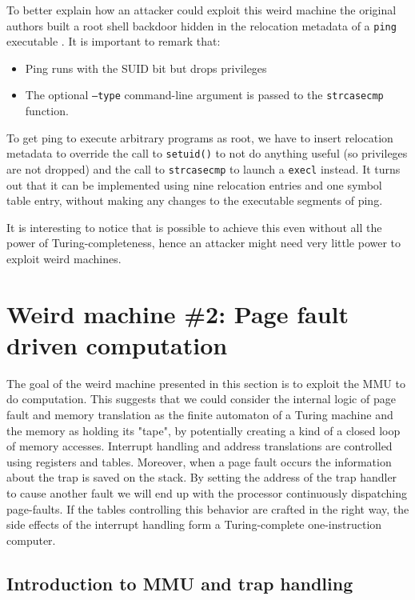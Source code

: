 \documentclass[11pt,twoside,a4paper]{article}
\begin{document}
To better explain how an attacker could exploit this weird machine the original authors built a root shell backdoor hidden in the relocation metadata of a \texttt{ping} executable \cite{ping_elf}. It is important to remark that: 
\begin{itemize}
\item Ping runs with the SUID bit but drops privileges 
\item The optional \texttt{--type} command-line argument is passed to the \texttt{strcasecmp} function.
\end{itemize}

To get ping to execute arbitrary programs as root, we have to insert relocation metadata to override the call to \texttt{setuid()} to not do anything useful (so privileges are not dropped) and the call to \texttt{strcasecmp} to launch a \texttt{execl} instead. It turns out that it can be implemented using nine relocation entries and one symbol table entry, without making any changes to the executable segments of ping.

It is interesting to notice that is possible to achieve this even without all the power of Turing-completeness, hence an attacker might need very little power to exploit weird machines.

\section{Weird machine \#2: Page fault driven computation}
The goal of the weird machine presented in this section is to exploit the MMU to do computation. This suggests that we could consider the internal logic of page fault and memory translation as the finite automaton of a Turing machine and the memory as holding its "tape", by potentially creating a kind of a closed loop of memory accesses.
Interrupt handling and address translations are controlled using registers and tables. Moreover, when a page fault occurs the information about the trap is saved on the stack. By setting the address of the trap handler to cause another fault we will end up with the processor continuously dispatching page-faults. If the tables controlling this behavior are crafted in the right way, the side effects of the interrupt handling form a Turing-complete one-instruction computer.

\subsection{Introduction to MMU and trap handling}
\end{document}
